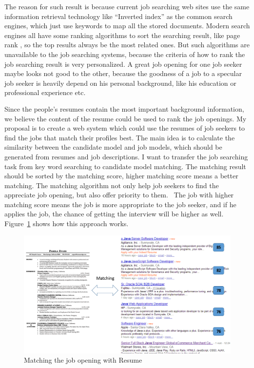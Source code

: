 The reason for such result is because current job searching web sites use the same information retrieval technology like ``Inverted index'' \cite{zobel2006inverted} as the common search engines, which just use keywords to map all the stored documents. Modern search engines all have some ranking algorithms to sort the searching result, like page rank \cite{page1999pagerank}, so the top results always be the most related ones. But such algorithms are unavailable to the job searching systems, because the criteria  of how to rank the job searching result is very personalized. A great job opening for one job seeker maybe looks not good to the other, because the goodness of a job to a specular job seeker is heavily depend on his personal background, like his education or professional experience etc.

Since the people's resumes contain the most important background information, we believe the content of the resume could be used to rank the job openings. My proposal is to create a web system which could use the resumes of job seekers to find the jobs that match their profiles best. The main idea is to calculate the similarity between the candidate model and job models, which should be generated from resumes and job descriptions. I want to transfer the job searching task from key word searching to candidate model matching. The matching result should be sorted by the matching score, higher matching score means a better matching. The matching algorithm not only help job seekers to find the appreciate job opening, but also offer priority to them.~\cite{gueutal2006brave}  The job with higher matching score means the job is more appropriate to the job seeker, and if he applies the job, the chance of getting the interview will be higher as well. Figure~\ref{fig:Matching} shows how this approach works.


\begin{figure}[htbp]
  \centering
  \includegraphics[scale=0.5]{images/matching.png}
  \caption{Matching the job opening with Resume}
  \label{fig:Matching}
\end{figure}

